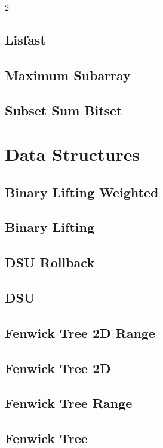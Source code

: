 \documentclass[a4paper,landscape,10pt]{article}
\begin{document}
\begin{multicols*}{2}
\subsection{Lisfast}

\subsection{Maximum Subarray}

\subsection{Subset Sum Bitset}

\section{Data Structures}
\subsection{Binary Lifting Weighted}

\subsection{Binary Lifting}

\subsection{DSU Rollback}

\subsection{DSU}

\subsection{Fenwick Tree 2D Range}

\subsection{Fenwick Tree 2D}

\subsection{Fenwick Tree Range}

\subsection{Fenwick Tree}


\end{multicols*}
\end{document}
